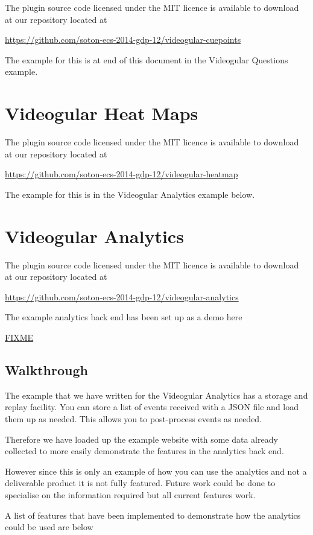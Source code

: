\documentclass[12pt,a4paper]{article}
\begin{document}
The plugin source code licensed under the MIT licence is available to download at our repository located at 

\url{https://github.com/soton-ecs-2014-gdp-12/videogular-cuepoints}

The example for this is at end of this document in the Videogular Questions example.

\section{Videogular Heat Maps}

The plugin source code licensed under the MIT licence is available to download at our repository located at 

\url{https://github.com/soton-ecs-2014-gdp-12/videogular-heatmap}

The example for this is in the Videogular Analytics example below.

\section{Videogular Analytics}

The plugin source code licensed under the MIT licence is available to download at our repository located at 

\url{https://github.com/soton-ecs-2014-gdp-12/videogular-analytics}

The example analytics back end has been set up as a demo here

\url{FIXME}

\subsection{Walkthrough}

The example that we have written for the Videogular Analytics has a storage and replay facility. You can store a list of events received with a JSON file and load them up as needed. This allows you to post-process events as needed.

Therefore we have loaded up the example website with some data already collected to more easily demonstrate the features in the analytics back end.

However since this is only an example of how you can use the analytics and not a deliverable product it is not fully featured. Future work could be done to specialise on the information required but all current features work.

A list of features that have been implemented to demonstrate how the analytics could be used are below
\end{document}

